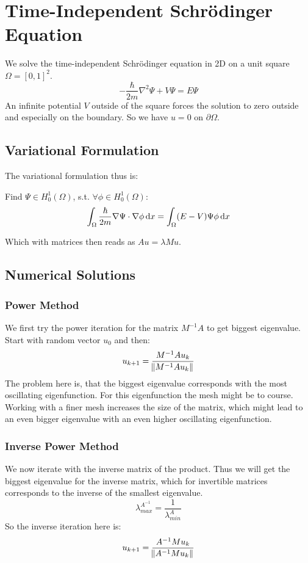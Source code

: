 \documentclass[a4paper,11pt]{scrartcl}
\newcommand*{\dx}{\dif{}x}
\begin{document}
\section{Time-Independent Schrödinger Equation}
We solve the time-independent Schrödinger equation in 2D on a unit square
$\Omega = [0,1]^2$.
\[ -\frac{\hbar}{2m} \nabla^2 \Psi + V \Psi = E \Psi\]
An infinite potential $V$ outside of the square forces the solution to zero
outside and especially on the boundary.
So we have $u = 0$ on $\partial\Omega$.

\subsection{Variational Formulation}
The variational formulation thus is:

Find $\Psi \in H^1_0(\Omega)$, s.t. $\forall \phi \in H^1_0(\Omega)$:
\[ \int_{\Omega} \frac{\hbar}{2m} \nabla \Psi \cdot \nabla\phi \dx =
  \int_{\Omega} (E - V) \Psi \phi\dx\]

Which with matrices then reads as $A u = \lambda M u$.

\subsection{Numerical Solutions}
\subsubsection{Power Method}
We first try the power iteration for the matrix $M^{-1} A$ to get biggest eigenvalue.
Start with random vector $u_0$ and then:
\[ u_{k+1} = \frac{M^{-1} A u_k}{\norm{M^{-1}Au_k}}\]
The problem here is, that the biggest eigenvalue corresponds with the most
oscillating eigenfunction.
For this eigenfunction the mesh might be to course.
Working with a finer mesh increases the size of the matrix, which might lead to
an even bigger eigenvalue with an even higher oscillating eigenfunction.

\subsubsection{Inverse Power Method}
We now iterate with the inverse matrix of the product.
Thus we will get the biggest eigenvalue for the inverse matrix, which for
invertible matrices corresponds to the inverse of the smallest eigenvalue.
\[ \lambda^{A^{-1}}_{max} = \frac{1}{\lambda^A_{min}} \]
So the inverse iteration here is:
\[ u_{k+1} = \frac{A^{-1} M u_k}{\norm{A^{-1}Mu_k}}\]
\end{document}
